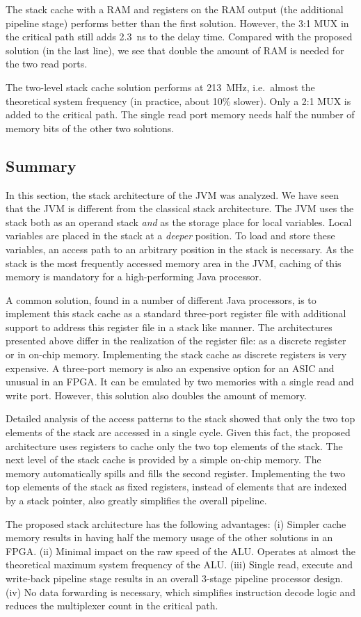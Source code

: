 The stack cache with a RAM and registers on the RAM output (the
additional pipeline stage) performs better than the first solution.
However, the 3:1 MUX in the critical path still adds 2.3~ns to the
delay time. Compared with the proposed solution (in the last line),
we see that double the amount of RAM is needed for the two read
ports.

The two-level stack cache solution performs at 213~MHz, i.e.\ almost
the theoretical system frequency (in practice, about 10{\%} slower).
Only a 2:1 MUX is added to the critical path. The single read port
memory needs half the number of memory bits of the other two
solutions.

\subsection{Summary}

In this section, the stack architecture of the JVM was analyzed. We
have seen that the JVM is different from the classical stack
architecture. The JVM uses the stack both as an operand stack
\textit{and} as the storage place for local variables. Local
variables are placed in the stack at a \textit{deeper} position. To
load and store these variables, an access path to an arbitrary
position in the stack is necessary. As the stack is the most
frequently accessed memory area in the JVM, caching of this memory
is mandatory for a high-performing Java processor.

A common solution, found in a number of different Java processors,
is to implement this stack cache as a standard three-port register
file with additional support to address this register file in a
stack like manner. The architectures presented above differ in the
realization of the register file: as a discrete register or in
on-chip memory. Implementing the stack cache as discrete registers
is very expensive. A three-port memory is also an expensive option
for an ASIC and unusual in an FPGA. It can be emulated by two
memories with a single read and write port. However, this solution
also doubles the amount of memory.

Detailed analysis of the access patterns to the stack showed that
only the two top elements of the stack are accessed in a single
cycle. Given this fact, the proposed architecture uses registers to
cache only the two top elements of the stack. The next level of the
stack cache is provided by a simple on-chip memory. The memory
automatically spills and fills the second register. Implementing the
two top elements of the stack as fixed registers, instead of
elements that are indexed by a stack pointer, also greatly
simplifies the overall pipeline.

The proposed stack architecture has the following advantages: (i)
Simpler cache memory results in having half the memory usage of the
other solutions in an FPGA. (ii) Minimal impact on the raw speed of
the ALU. Operates at almost the theoretical maximum system frequency
of the ALU. (iii) Single read, execute and write-back pipeline stage
results in an overall 3-stage pipeline processor design. (iv) No
data forwarding is necessary, which simplifies instruction decode
logic and reduces the multiplexer count in the critical path.
